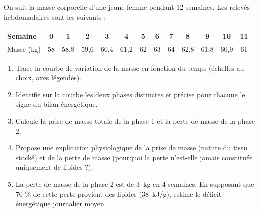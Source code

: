 \documentclass[11pt]{article}
\begin{document}
\begin{exercice}
On suit la masse corporelle d'une jeune femme pendant 12 semaines. Les relevés hebdomadaires sont les suivants :

\begin{center}
\begin{tabular}{|l|c|c|c|c|c|c|c|c|c|c|c|c|}
\hline
Semaine & 0 & 1 & 2 & 3 & 4 & 5 & 6 & 7 & 8 & 9 & 10 & 11 \\
\hline
Masse (kg) & 58 & 58,8 & 59,6 & 60,4 & 61,2 & 62 & 63 & 64 & 62,8 & 61,8 & 60,9 & 61 \\
\hline
\end{tabular}
\end{center}

\begin{enumerate}
\item Trace la courbe de variation de la masse en fonction du temps (échelles au choix, axes légendés).
\item Identifie sur la courbe les deux phases distinctes et précise pour chacune le signe du bilan énergétique.
\item Calcule la prise de masse totale de la phase 1 et la perte de masse de la phase 2.
\item Propose une explication physiologique de la prise de masse (nature du tissu stocké) et de la perte de masse (pourquoi la perte n'est-elle jamais constituée uniquement de lipides ?).
\item La perte de masse de la phase 2 est de \SI{3}{kg} en 4 semaines. En supposant que 70 \% de cette perte provient des lipides (\SI{38}{kJ/g}), estime le déficit énergétique journalier moyen.
\end{enumerate}
\end{exercice}
\end{document}
